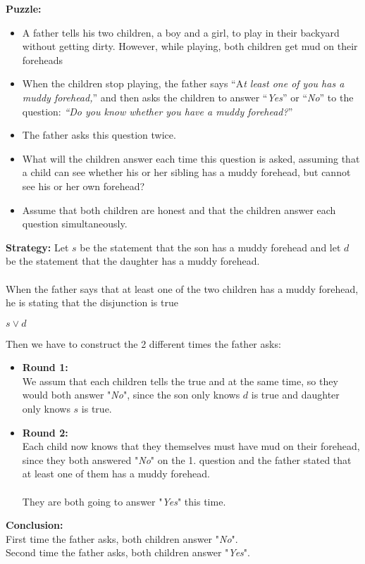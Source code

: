 \begin{tcolorbox}[title=Example 3: Muddy children puzzle]
\textbf{Puzzle:}  
\begin{itemize}
    \item A father tells his two children, a boy and a girl, to play in their backyard without getting dirty. However, while playing, both children get mud on their foreheads
    \item When the children stop playing,
the father says “A\textit{t least one of you has a muddy forehead,}” and then asks the children to
answer “\textit{Yes}” or “\textit{No}” to the question: \textit{“Do you know whether you have a muddy forehead?}”
    \item The father asks this question twice. 
    \item What will the children answer each time this question is asked, assuming that a child can see whether his or her sibling has a muddy forehead, but cannot see his or her own forehead?
    \item Assume that both children are honest and that the children answer each question simultaneously.
\end{itemize}

\textbf{Strategy:}  
Let $s$ be the statement that the son has a muddy forehead and let $d$ be the statement that
the daughter has a muddy forehead. 
\\ \\ 
When the father says that at least one of the two children
has a muddy forehead, he is stating that the disjunction is true
\begin{center}
$s \lor d$
\end{center}
Then we have to construct the 2 different times the father asks:
\begin{itemize}
    \item \textbf{Round 1:}\\
    We assum that each children tells the true and at the same time, so they would both answer "\textit{No}", since the son only knows $d$ is true and daughter only knows $s$ is true. 
    \item \textbf{Round 2:}\\
    Each child now knows that they themselves must have mud on their forehead, since they both answered "\textit{No}" on the 1. question and the father stated that at least one of them has a muddy forehead. \\ \\ They are both going to answer "\textit{Yes}" this time.
\end{itemize}
\textbf{Conclusion:} \\
First time the father asks, both children answer "\textit{No}". \\ Second time the father asks, both children answer "\textit{Yes}".
 
\end{tcolorbox}

